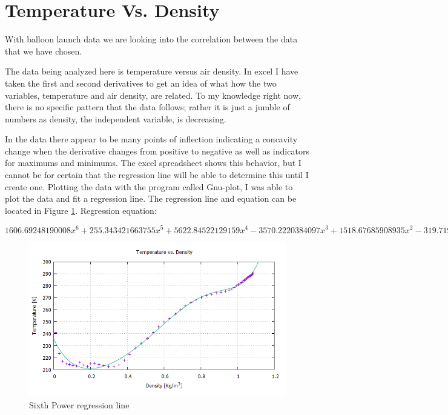 \documentclass{article}
\begin{document}
\part{Temperature Vs. Density}

With balloon launch data we are looking into the correlation between the data that we have chosen.

The data being analyzed here is temperature versus air density. In excel I have taken the first and second derivatives to get an idea of what how the two variables, temperature and air density, are related. To my knowledge right now, there is no specific pattern that the data follows; rather it is just a jumble of numbers as density, the independent variable, is decreasing.

In the data there appear to be many points of inflection indicating a concavity change when the derivative changes from positive to negative as well as indicators for maximums and minimums. The excel spreadsheet shows this behavior, but I cannot be for certain that the regression line will be able to determine this until I create one. Plotting the data with the program called Gnu-plot, I was able to plot the data and fit a regression line. The regression line and equation can be located in Figure \ref{nate1}.
Regression equation:

\begin{dmath*}
  1606.69248190008x^6 + 255.343421663755x^5 + 5622.84522129159x^4 -3570.2220384097x^3 + 1518.67685908935x^2 -319.719301948874x +235.092280725325
\end{dmath*}

\begin{figure}
\centering
\includegraphics[scale=0.5]{nate-data/six}
\caption{Sixth Power regression line}
\label{nate1}
\end{figure}
\end{document}
